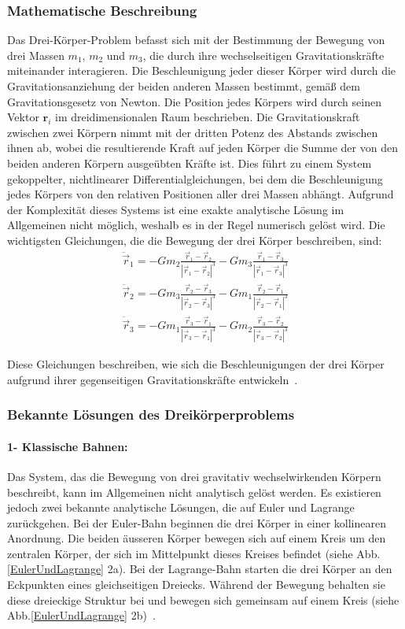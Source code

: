 \documentclass[a4paper,12pt,twoside]{article}
\begin{document}
\subsubsection{Mathematische Beschreibung}
Das Drei-Körper-Problem befasst sich mit der Bestimmung der Bewegung von drei Massen \( m_1 \), \( m_2 \) und \( m_3 \), die durch ihre wechselseitigen Gravitationskräfte miteinander interagieren. Die Beschleunigung jeder dieser Körper wird durch die Gravitationsanziehung der beiden anderen Massen bestimmt, gemäß dem Gravitationsgesetz von Newton. Die Position jedes Körpers wird durch seinen Vektor \( \mathbf{r}_i \) im dreidimensionalen Raum beschrieben. Die Gravitationskraft zwischen zwei Körpern nimmt mit der dritten Potenz des Abstands zwischen ihnen ab, wobei die resultierende Kraft auf jeden Körper die Summe der von den beiden anderen Körpern ausgeübten Kräfte ist. Dies führt zu einem System gekoppelter, nichtlinearer Differentialgleichungen, bei dem die Beschleunigung jedes Körpers von den relativen Positionen aller drei Massen abhängt. Aufgrund der Komplexität dieses Systems ist eine exakte analytische Lösung im Allgemeinen nicht möglich, weshalb es in der Regel numerisch gelöst wird.
Die wichtigsten Gleichungen, die die Bewegung der drei Körper beschreiben, sind:
\begin{align*}
	\ddot{\vec{r}}_1 = -G m_2 \frac{\vec{r}_1 - \vec{r}_2}{|\vec{r}_1 - \vec{r}_2|^3} - G m_3 \frac{\vec{r}_1 - \vec{r}_3}{|\vec{r}_1 - \vec{r}_3|^3} \\
	\ddot{\vec{r}}_2 = -G m_3 \frac{\vec{r}_2 - \vec{r}_3}{|\vec{r}_2 - \vec{r}_3|^3} - G m_1 \frac{\vec{r}_2 - \vec{r}_1}{|\vec{r}_2 - \vec{r}_1|^3} \\
	\ddot{\vec{r}}_3 = -G m_1 \frac{\vec{r}_3 - \vec{r}_1}{|\vec{r}_3 - \vec{r}_1|^3} - G m_2 \frac{\vec{r}_3 - \vec{r}_2}{|\vec{r}_3 - \vec{r}_2|^3}
\end{align*}


Diese Gleichungen beschreiben, wie sich die Beschleunigungen der drei Körper aufgrund ihrer gegenseitigen Gravitationskräfte entwickeln~\cite{threebodylibretexts}.

\subsubsection{Bekannte Lösungen des Dreikörperproblems}
\paragraph{1- Klassische Bahnen:}
Das System, das die Bewegung von drei gravitativ wechselwirkenden Körpern beschreibt, 
kann im Allgemeinen nicht analytisch gelöst werden. 
Es existieren jedoch zwei bekannte analytische Lösungen, 
die auf Euler und Lagrange zurückgehen.
Bei der Euler-Bahn beginnen die drei Körper in einer kollinearen Anordnung. 
Die beiden äusseren Körper bewegen sich auf einem Kreis um den zentralen Körper, 
der sich im Mittelpunkt dieses Kreises befindet (siehe Abb.\ref{EulerUndLagrange} 2a).
Bei der Lagrange-Bahn starten die drei Körper an den Eckpunkten eines gleichseitigen 
Dreiecks. Während der Bewegung behalten sie diese dreieckige Struktur bei und 
bewegen sich gemeinsam auf einem Kreis (siehe Abb.\ref{EulerUndLagrange} 2b)~\cite{Ramos2019}.
\end{document}
